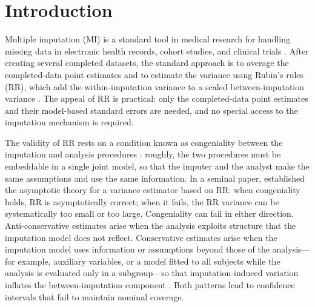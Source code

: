 \section{Introduction}\label{introduction}

Multiple imputation (MI) is a standard tool in medical research for
handling missing data in electronic health records, cohort studies, and
clinical trials \citep{rubin1987multiple}.  After creating several
completed datasets, the standard approach is to average the
completed-data point estimates and to estimate the variance using
Rubin's rules (RR), which add the within-imputation variance to a
scaled between-imputation variance
\citep{rubin1987multiple, vanbuuren2011mice, sterne2009multiple, white2011multiple}.
The appeal of RR is practical: only the completed-data point estimates
and their model-based standard errors are needed, and no special access
to the imputation mechanism is required.

The validity of RR rests on a condition known as congeniality between the imputation and analysis procedures \citep{meng1994multiple, xie2017dissecting, bartlett2020bootstrap}: roughly, the two procedures must be embeddable in a single joint model, so that the imputer and the analyst make the same assumptions and use the same information. In a seminal paper, \citet{wang1998large} established the asymptotic theory for a variance estimator based on RR: when congeniality holds, RR is asymptotically correct; when it fails, the RR variance can be systematically too small or too large. Congeniality can fail in either direction. Anti-conservative estimates arise when the analysis exploits structure that the imputation model does not reflect. Conservative estimates arise when the imputation model uses information or assumptions beyond those of the analysis—for example, auxiliary variables, or a model fitted to all subjects while the analysis is evaluated only in a subgroup—so that imputation-induced variation inflates the between-imputation component \citep{meng1994multiple}. Both patterns lead to confidence intervals that fail to maintain nominal coverage.

